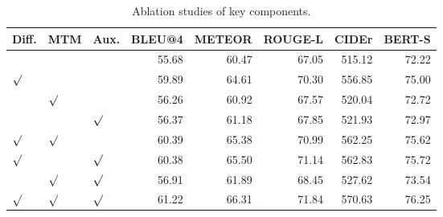 \begin{table}[ht]
\centering
\small
\caption{Ablation studies of key components.}
\label{tab:key}
\begin{tabular}{lllrrrrr}
\toprule
Diff. & MTM & Aux. & BLEU@4 & METEOR & ROUGE-L & CIDEr & BERT-S \\
\midrule
 &  &  & 55.68 & 60.47 & 67.05 & 515.12 & 72.22 \\
$\surd$ &  &  & 59.89 & 64.61 & 70.30 & 556.85 & 75.00 \\
 & $\surd$ &  & 56.26 & 60.92 & 67.57 & 520.04 & 72.72 \\
 &  & $\surd$ & 56.37 & 61.18 & 67.85 & 521.93 & 72.97 \\
$\surd$ & $\surd$ &  & 60.39 & 65.38 & 70.99 & 562.25 & 75.62 \\
$\surd$ &  & $\surd$ & 60.38 & 65.50 & 71.14 & 562.83 & 75.72 \\
 & $\surd$ & $\surd$ & 56.91 & 61.89 & 68.45 & 527.62 & 73.54 \\
$\surd$ & $\surd$ & $\surd$ & 61.22 & 66.31 & 71.84 & 570.63 & 76.25 \\
\bottomrule
\end{tabular}
\end{table}
